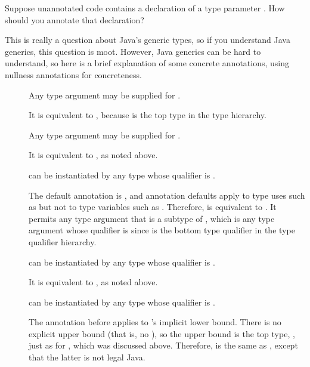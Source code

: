 
Suppose unannotated code contains a declaration of a type parameter
.  How should you annotate that declaration?

This is really a question about Java's generic types, so if you understand
Java generics, this question is moot.  However, Java generics can be hard
to understand, so here is a brief explanation of some concrete annotations,
using nullness annotations for concreteness.

\begin{description}
\item[]
  Any type argument may be supplied for .

  It is equivalent to , because
   is the top type in the type hierarchy.

\item[]
  Any type argument may be supplied for .

  It is equivalent to , as noted above.

\item[]
   can be instantiated by any type whose qualifier is .

  The default annotation is , and annotation defaults apply
  to type uses such as  but not to type variables such as
  .  Therefore,  is equivalent to
  .  It permits any type argument that is
  a subtype of , which is any type argument whose
  qualifier is  since  is the bottom type
  qualifier in the type qualifier hierarchy.

\item[]
   can be instantiated by any type whose qualifier is .

  It is equivalent to , as noted above.

\item[]
   can be instantiated by any type whose qualifier is .

  The annotation  before  applies to 's
  implicit lower bound.  There is no explicit upper bound (that is, no
  ), so the upper bound is the top type, , just as for , which was discussed above.  Therefore,
   is the same as , except that the latter is not legal Java.


\end{description}
